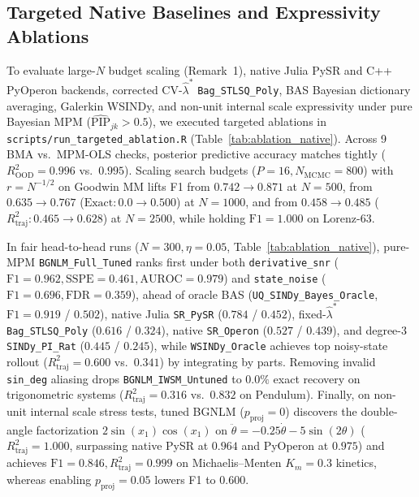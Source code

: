 \documentclass{article}
\begin{document}
\subsection{Targeted Native Baselines and Expressivity Ablations}
\label{sec:targeted_ablation}

To evaluate large-$N$ budget scaling (Remark~1), native Julia PySR and C++ PyOperon backends, corrected CV-$\hat{\lambda}^*$ \texttt{Bag\_STLSQ\_Poly}, BAS Bayesian dictionary averaging, Galerkin WSINDy, and non-unit internal scale expressivity under pure Bayesian MPM ($\widehat{\text{PIP}}_{jk} > 0.5$), we executed targeted ablations in \texttt{scripts/run\_targeted\_ablation.R} (Table~\ref{tab:ablation_native}). Across 9 BMA vs.\ MPM-OLS checks, posterior predictive accuracy matches tightly ($R^2_{\text{OOD}}=0.996$ vs.\ $0.995$). Scaling search budgets ($P=16, N_{\text{MCMC}}=800$) with $r=N^{-1/2}$ on Goodwin MM lifts F1 from $0.742 \to 0.871$ at $N=500$, from $0.635 \to 0.767$ ($\text{Exact}: 0.0 \to 0.500$) at $N=1000$, and from $0.458 \to 0.485$ ($R^2_{\text{traj}}: 0.465 \to 0.628$) at $N=2500$, while holding $\text{F1}=1.000$ on Lorenz-63.

In fair head-to-head runs ($N=300, \eta=0.05$, Table~\ref{tab:ablation_native}), pure-MPM \texttt{BGNLM\_Full\_Tuned} ranks first under both \texttt{derivative\_snr} ($\text{F1}=0.962, \text{SSPE}=0.461, \text{AUROC}=0.979$) and \texttt{state\_noise} ($\text{F1}=0.696, \text{FDR}=0.359$), ahead of oracle BAS (\texttt{UQ\_SINDy\_Bayes\_Oracle}, $\text{F1}=0.919$ / $0.502$), native Julia \texttt{SR\_PySR} ($0.784$ / $0.452$), fixed-$\hat{\lambda}^*$ \texttt{Bag\_STLSQ\_Poly} ($0.616$ / $0.324$), native \texttt{SR\_Operon} ($0.527$ / $0.439$), and degree-3 \texttt{SINDy\_PI\_Rat} ($0.445$ / $0.245$), while \texttt{WSINDy\_Oracle} achieves top noisy-state rollout ($R^2_{\text{traj}}=0.600$ vs.\ $0.341$) by integrating by parts. Removing invalid \texttt{sin\_deg} aliasing drops \texttt{BGNLM\_IWSM\_Untuned} to $0.0\%$ exact recovery on trigonometric systems ($R^2_{\text{traj}}=0.316$ vs.\ $0.832$ on Pendulum). Finally, on non-unit internal scale stress tests, tuned BGNLM ($p_{\text{proj}}=0$) discovers the double-angle factorization $2\sin(x_1)\cos(x_1)$ on $\ddot{\theta} = -0.25\dot{\theta}-5\sin(2\theta)$ ($R^2_{\text{traj}}=1.000$, surpassing native PySR at $0.964$ and PyOperon at $0.975$) and achieves $\text{F1}=0.846, R^2_{\text{traj}}=0.999$ on Michaelis--Menten $K_m=0.3$ kinetics, whereas enabling $p_{\text{proj}}=0.05$ lowers F1 to $0.600$.
\end{document}

